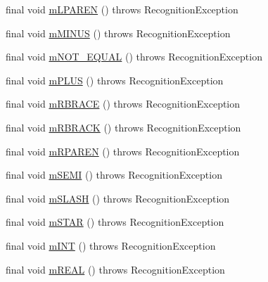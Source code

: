 \begin{DoxyCompactItemize}
\item 
final void \hyperlink{classorg_1_1tzi_1_1use_1_1parser_1_1shell_1_1_shell_command_lexer_a0a4bd28f09aab911e11d8539849cfa0a}{m\-L\-P\-A\-R\-E\-N} ()  throws Recognition\-Exception 
\item 
final void \hyperlink{classorg_1_1tzi_1_1use_1_1parser_1_1shell_1_1_shell_command_lexer_a6c946e3ae2b92e6587a92c4495ea588c}{m\-M\-I\-N\-U\-S} ()  throws Recognition\-Exception 
\item 
final void \hyperlink{classorg_1_1tzi_1_1use_1_1parser_1_1shell_1_1_shell_command_lexer_a92353690bd1bb31d71e6a355571f2b74}{m\-N\-O\-T\-\_\-\-E\-Q\-U\-A\-L} ()  throws Recognition\-Exception 
\item 
final void \hyperlink{classorg_1_1tzi_1_1use_1_1parser_1_1shell_1_1_shell_command_lexer_ac49247bbf8c2a02ce901d0be2a5fd46e}{m\-P\-L\-U\-S} ()  throws Recognition\-Exception 
\item 
final void \hyperlink{classorg_1_1tzi_1_1use_1_1parser_1_1shell_1_1_shell_command_lexer_acd531e749b0c4a48a18de529f71fdc2d}{m\-R\-B\-R\-A\-C\-E} ()  throws Recognition\-Exception 
\item 
final void \hyperlink{classorg_1_1tzi_1_1use_1_1parser_1_1shell_1_1_shell_command_lexer_a99e68e42ed9abb098116a27cff6aa07f}{m\-R\-B\-R\-A\-C\-K} ()  throws Recognition\-Exception 
\item 
final void \hyperlink{classorg_1_1tzi_1_1use_1_1parser_1_1shell_1_1_shell_command_lexer_a7e85e1d793867b002901eb5bd94e856b}{m\-R\-P\-A\-R\-E\-N} ()  throws Recognition\-Exception 
\item 
final void \hyperlink{classorg_1_1tzi_1_1use_1_1parser_1_1shell_1_1_shell_command_lexer_ad88eef43cd5759256b7bb952b3be77c2}{m\-S\-E\-M\-I} ()  throws Recognition\-Exception 
\item 
final void \hyperlink{classorg_1_1tzi_1_1use_1_1parser_1_1shell_1_1_shell_command_lexer_a60ddf4de0f907d663f9086a0068317c8}{m\-S\-L\-A\-S\-H} ()  throws Recognition\-Exception 
\item 
final void \hyperlink{classorg_1_1tzi_1_1use_1_1parser_1_1shell_1_1_shell_command_lexer_a5e3782decd73e7220f07421812e1aa46}{m\-S\-T\-A\-R} ()  throws Recognition\-Exception 
\item 
final void \hyperlink{classorg_1_1tzi_1_1use_1_1parser_1_1shell_1_1_shell_command_lexer_af33fcc49dc5a33adf4d174322d4972bf}{m\-I\-N\-T} ()  throws Recognition\-Exception 
\item 
final void \hyperlink{classorg_1_1tzi_1_1use_1_1parser_1_1shell_1_1_shell_command_lexer_a48663a705b4644e78e75ee236428bf6e}{m\-R\-E\-A\-L} ()  throws Recognition\-Exception 

\end{DoxyCompactItemize}
